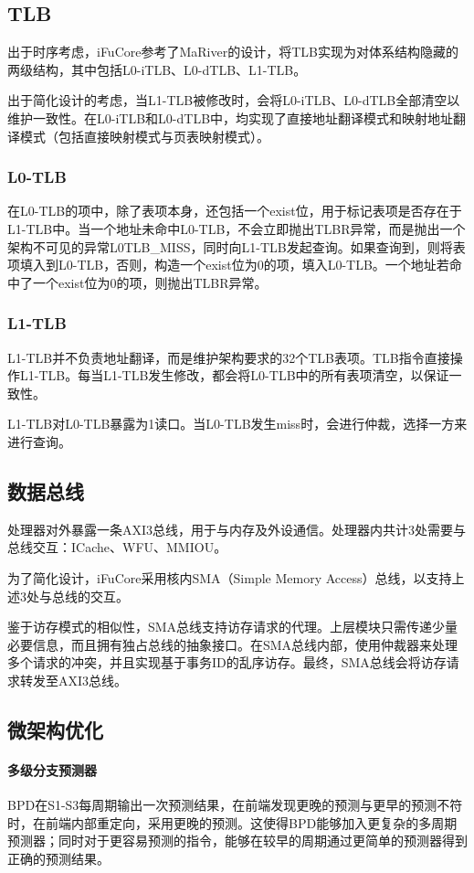 \documentclass{article}
\begin{document}
\subsection{TLB}
出于时序考虑，iFuCore参考了MaRiver的设计，将TLB实现为对体系结构隐藏的两级结构，其中包括L0-iTLB、L0-dTLB、L1-TLB。\par
出于简化设计的考虑，当L1-TLB被修改时，会将L0-iTLB、L0-dTLB全部清空以维护一致性。在L0-iTLB和L0-dTLB中，均实现了直接地址翻译模式和映射地址翻译模式（包括直接映射模式与页表映射模式）。\par
\subsubsection{L0-TLB}
在L0-TLB的项中，除了表项本身，还包括一个exist位，用于标记表项是否存在于L1-TLB中。当一个地址未命中L0-TLB，不会立即抛出TLBR异常，而是抛出一个架构不可见的异常L0TLB\_MISS，同时向L1-TLB发起查询。如果查询到，则将表项填入到L0-TLB，否则，构造一个exist位为0的项，填入L0-TLB。一个地址若命中了一个exist位为0的项，则抛出TLBR异常。\par
\subsubsection{L1-TLB}
L1-TLB并不负责地址翻译，而是维护架构要求的32个TLB表项。TLB指令直接操作L1-TLB。每当L1-TLB发生修改，都会将L0-TLB中的所有表项清空，以保证一致性。\par
L1-TLB对L0-TLB暴露为1读口。当L0-TLB发生miss时，会进行仲裁，选择一方来进行查询。\par

\subsection{数据总线}
处理器对外暴露一条AXI3总线，用于与内存及外设通信。处理器内共计3处需要与总线交互：ICache、WFU、MMIOU。\par
为了简化设计，iFuCore采用核内SMA（Simple Memory Access）总线，以支持上述3处与总线的交互。\par
鉴于访存模式的相似性，SMA总线支持访存请求的代理。上层模块只需传递少量必要信息，而且拥有独占总线的抽象接口。在SMA总线内部，使用仲裁器来处理多个请求的冲突，并且实现基于事务ID的乱序访存。最终，SMA总线会将访存请求转发至AXI3总线。\par

\subsection{微架构优化}
\paragraph{多级分支预测器}
BPD在S1-S3每周期输出一次预测结果，在前端发现更晚的预测与更早的预测不符时，在前端内部重定向，采用更晚的预测。这使得BPD能够加入更复杂的多周期预测器；同时对于更容易预测的指令，能够在较早的周期通过更简单的预测器得到正确的预测结果。\par
\end{document}
